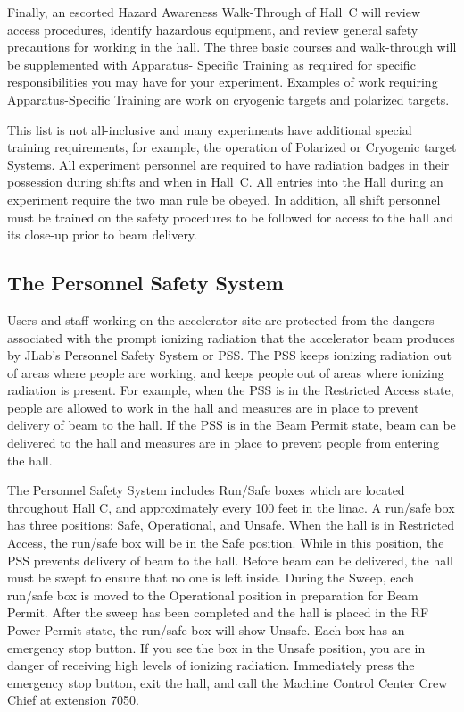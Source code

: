 Finally, an escorted Hazard Awareness Walk-Through of Hall~C will review
access
procedures, identify hazardous equipment, and review general safety
precautions for working in
the hall. The three basic courses and walk-through will be supplemented
with Apparatus-
Specific Training as required for specific responsibilities you may have
for your experiment.
Examples of work requiring Apparatus-Specific Training are work on
cryogenic targets and
polarized targets.

This list is not all-inclusive and many experiments have additional
special training
requirements, for example, the operation of Polarized or Cryogenic target
Systems. All
experiment personnel are required to have radiation badges in their
possession during shifts and
when in Hall~C. All entries into the Hall during an experiment require the
two man rule be
obeyed. In addition, all shift personnel must be trained on the safety
procedures to be followed
for access to the hall and its close-up prior to beam delivery.

\subsection{The Personnel Safety System}

Users and staff working on the accelerator site are protected from the
dangers associated
with the prompt ionizing radiation that the accelerator beam produces by
JLab's Personnel
Safety System or PSS. The PSS keeps ionizing radiation out of areas where
people are
working, and keeps people out of areas where ionizing radiation is present.
For example, when
the PSS is in the Restricted Access state, people are allowed to work in
the hall and measures
are in place to prevent delivery of beam to the hall. If the PSS is in the
Beam Permit state, beam
can be delivered to the hall and measures are in place to prevent people
from entering the hall.

The Personnel Safety System includes Run/Safe boxes which are located
throughout Hall
C, and approximately every 100 feet in the linac. A run/safe box has three
positions: Safe,
Operational, and Unsafe. When the hall is in Restricted Access, the
run/safe box will be in the
Safe position. While in this position, the PSS prevents delivery of beam to
the hall. Before
beam can be delivered, the hall must be swept to ensure that no one is left
inside. During the
Sweep, each run/safe box is moved to the Operational position in
preparation for Beam Permit. After the sweep has been completed and the
hall is placed in the
RF Power Permit state, the run/safe box will show Unsafe. Each box has an
emergency stop
button. If you see the box in the Unsafe position, you are in danger of
receiving high levels of
ionizing radiation. Immediately press the emergency stop button, exit the
hall, and call the
Machine Control Center Crew Chief at extension 7050.

